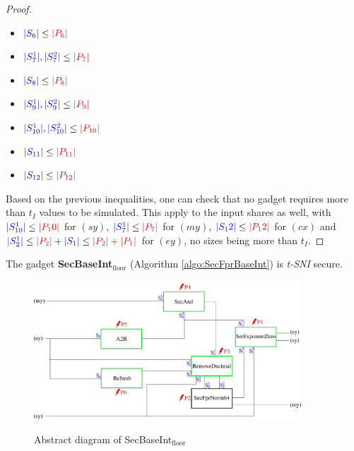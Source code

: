 \documentclass[runningheads]{llncs}
\begin{document}
\begin{proof}
\begin{multicols}{2}
\begin{itemize}
      \item $\textcolor{blue}{|S_6|} \leq \textcolor{red}{|P_6|}$
      \item $\textcolor{blue}{|S_7^1|,|S_7^2|} \leq \textcolor{red}{|P_7|}$
      \item $\textcolor{blue}{|S_8|} \leq \textcolor{red}{|P_8|}$
      \item $\textcolor{blue}{|S_9^1|,|S_9^2|} \leq \textcolor{red}{|P_9|}$
      \item $\textcolor{blue}{|S_{10}^1|,|S_{10}^2|} \leq \textcolor{red}{|P_{10}|}$
      \item $\textcolor{blue}{|S_{11}|} \leq \textcolor{red}{|P_{11}|}$
      \item $\textcolor{blue}{|S_{12}|} \leq \textcolor{red}{|P_{12}|}$
    \end{itemize}
  \end{multicols}
  Based on the previous inequalities, one can check that no gadget requires more than $t_I$ values to be simulated. This apply to the input shares as well, with $\textcolor{blue}{|S_{10}^1|}\leq\textcolor{red}{|P_10|}$ for $(sy)$, $\textcolor{blue}{|S_7^1|}\leq\textcolor{red}{|P_7|}$ for $(my)$, $\textcolor{blue}{|S_12|} \leq \textcolor{red}{|P_12|}$ for $(cx)$ and $\textcolor{blue}{|S_2^1|}\leq\textcolor{red}{|P_2|} + \textcolor{blue}{|S_1|} \leq \textcolor{red}{|P_2| + |P_1|}$ for $(ey)$, no sizes being more than $t_I$.
\end{proof}

\begin{theorem}
  The gadget \textbf{SecBaseInt$_\text{floor}$} (Algorithm \ref{algo:SecFprBaseInt}) is \emph{t-SNI} secure.


\begin{figure}[!ht]
  \centering
  \includegraphics[width=10cm]{figure/secbaseint2.pdf}
  \label{fig:secbaseint}
  \caption{Abstract diagram of SecBaseInt$_\text{floor}$}
\end{figure}
\end{theorem}
\end{document}

